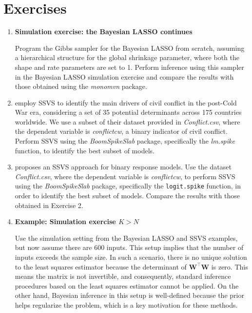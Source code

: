\section{Exercises}\label{13_7}

\begin{enumerate}
	\item \textbf{Simulation exercise: the Bayesian LASSO continues}
	
	Program the Gibbs sampler for the Bayesian LASSO from scratch, assuming a hierarchical structure for the global shrinkage parameter, where both the shape and rate parameters are set to 1. Perform inference using this sampler in the Bayesian LASSO simulation exercise and compare the results with those obtained using the \textit{monomvn} package.
	
	\item \cite{jetter2022postcold} employ SSVS to identify the main drivers of civil conflict in the post-Cold War era, considering a set of 35 potential determinants across 175 countries worldwide. We use a subset of their dataset provided in \textit{Conflict.csv}, where the dependent variable is \textit{conflictcw}, a binary indicator of civil conflict. Perform SSVS using the \textit{BoomSpikeSlab} package, specifically the \textit{lm.spike} function, to identify the best subset of models.
	
	\item \cite{tuchler2008bayesian} proposes an SSVS approach for binary response models. Use the dataset \textit{Conflict.csv}, where the dependent variable is \textit{conflictcw}, to perform SSVS using the \textit{BoomSpikeSlab} package, specifically the \texttt{logit.spike} function, in order to identify the best subset of models. Compare the results with those obtained in Exercise 2.
	
	\item \textbf{Example: Simulation exercise $K > N$}
	
	Use the simulation setting from the Bayesian LASSO and SSVS examples, but now assume there are 600 inputs. This setup implies that the number of inputs exceeds the sample size. In such a scenario, there is no unique solution to the least squares estimator because the determinant of $\mathbf{W}^{\top} \mathbf{W}$ is zero. This means the matrix is not invertible, and consequently, standard inference procedures based on the least squares estimator cannot be applied. On the other hand, Bayesian inference in this setup is well-defined because the prior helps regularize the problem, which is a key motivation for these methods.
	

\end{enumerate}
